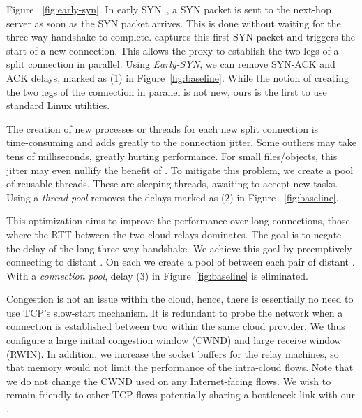  \xspace Figure ~\ref{fig:early-syn}. In early SYN~\cite{ladiwala,siracusano2016miniproxy}, a SYN packet is sent to the next-hop server as soon as the SYN packet arrives. This is done without waiting for the three-way handshake to complete. \oursys captures this first SYN packet and triggers the start of a new connection. This allows the proxy to establish the two legs of a split connection in parallel. Using \textit{Early-SYN}, we can remove SYN-ACK and ACK delays, marked as (1) in Figure~\ref{fig:baseline}.
While the notion of creating the two legs of the connection in parallel is not new, ours is the first to use standard Linux utilities.

The creation of new processes or threads for each new split connection is \\time-consuming and adds greatly to the connection jitter. Some outliers may take tens of milliseconds, greatly hurting performance. For small files/objects, this jitter may even nullify the benefit of \oursys. To mitigate this problem, we create a pool of reusable threads. These are sleeping threads, awaiting to accept new tasks. Using a \textit{thread pool} removes the delays marked as (2) in Figure ~\ref{fig:baseline}. 

  This optimization aims to improve the performance over long connections, \ie those where the RTT between the two cloud relays dominates. The goal is to negate the delay of the long three-way handshake. We achieve this goal by preemptively connecting to distant \relays. On each \relay we create a pool of \reconn between each pair of distant \relays.
With a \textit{connection pool}, delay (3) in Figure~\ref{fig:baseline} is eliminated. 

Congestion is not an issue within the cloud, hence, there is essentially no need to use TCP's slow-start mechanism. It is redundant to probe the network when a connection is established between two \relays within the same cloud provider. We thus configure a large initial congestion window (CWND) and large receive window (RWIN). In addition, we increase the socket buffers for the relay machines, so that memory would not limit the performance of the intra-cloud flows.
Note that we do not change the CWND used on any Internet-facing flows. We wish to remain friendly to other TCP flows potentially sharing a bottleneck link with our \relays.

